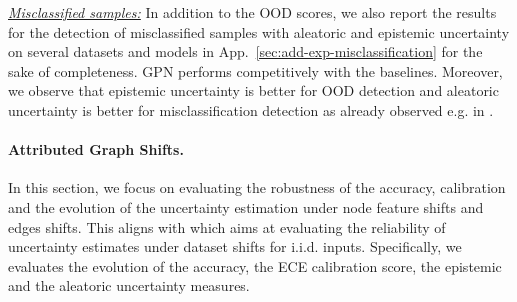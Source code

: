 \textit{\underline{Misclassified samples:}} In addition to the OOD scores, we also report the results for the detection of misclassified samples with aleatoric and epistemic uncertainty on several datasets and models in App.~\ref{sec:add-exp-misclassification} for the sake of completeness. GPN performs competitively with the baselines. Moreover, we observe that epistemic uncertainty is better for OOD detection and aleatoric uncertainty is better for misclassification detection as already observed  e.g. in \citep{Zhao2020}.




\paragraph{Attributed Graph Shifts.} In this section, we focus on evaluating the robustness of the accuracy, calibration and the evolution of the uncertainty estimation under node feature shifts and edges shifts. This aligns with \citep{dataset-shift} which aims at evaluating the reliability of uncertainty estimates under dataset shifts for i.i.d. inputs. Specifically, we evaluates the evolution of the accuracy, the ECE \citep{Naeini2015} calibration score, the epistemic and the aleatoric uncertainty measures. 


